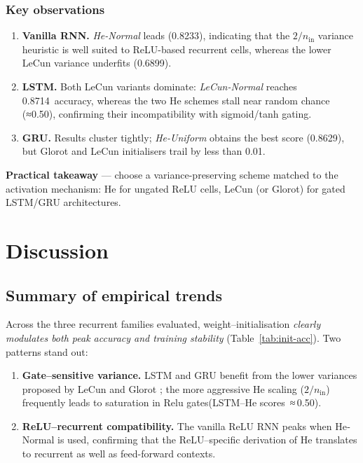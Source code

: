 \documentclass[conference]{IEEEtran}
\begin{document}
\subsubsection{Key observations}

\begin{enumerate}
  \item \textbf{Vanilla RNN.}  \emph{He-Normal} leads (0.8233), indicating
        that the $2/n_{\text{in}}$ variance heuristic is well suited to
        ReLU-based recurrent cells, whereas the lower LeCun variance underfits
        (0.6899).
  \item \textbf{LSTM.}  Both LeCun variants dominate: \emph{LeCun-Normal}
        reaches 0.8714~accuracy, whereas the two He schemes stall near random
        chance (≈0.50), confirming their incompatibility with sigmoid/tanh
        gating.
  \item \textbf{GRU.}  Results cluster tightly; \emph{He-Uniform} obtains the
        best score (0.8629), but Glorot and LeCun initialisers trail by less
        than 0.01.
\end{enumerate}

\noindent
\textbf{Practical takeaway} — choose a variance-preserving scheme matched to
the activation mechanism: He for ungated ReLU cells, LeCun (or Glorot) for
gated LSTM/GRU architectures.


\section*{Discussion}\label{sec:discussion}

\subsection{Summary of empirical trends}

Across the three recurrent families evaluated, weight–initialisation
\emph{clearly modulates both peak accuracy and training stability}
(Table~\ref{tab:init-acc}).  Two patterns stand out:

\begin{enumerate}
  \item \textbf{Gate–sensitive variance.}  
        LSTM and GRU benefit from the lower variances proposed by
        LeCun \cite{lecun1998efficient} and Glorot \cite{glorot2010understanding};
        the more aggressive He scaling
        ($2/n_{\text{in}}$) frequently leads to saturation in Relu
        gates(LSTM–He scores~≈\,0.50).
  \item \textbf{ReLU–recurrent compatibility.}  
        The vanilla ReLU RNN peaks when He‐Normal is used, confirming
        that the ReLU–specific derivation of He \cite{he2015delving}
        translates to recurrent as well as feed-forward contexts.
\end{enumerate}
\end{document}
